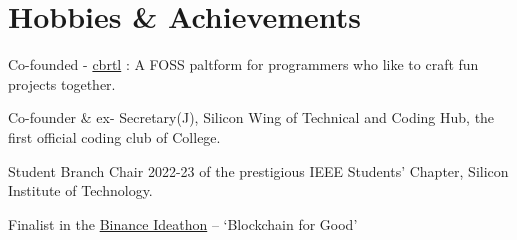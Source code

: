 \documentclass[]{assets/deedy-resume-openfont}
\begin{document}
\section{Hobbies \& Achievements}
\begin{tightemize}  
    \item Co-founded - \href{https://cbrtl.github.io}{cbrtl} : A FOSS paltform for programmers who like to craft fun projects together.\\
    \item Co-founder \& ex- Secretary(J), Silicon Wing of Technical and Coding Hub, the first official coding club of College.\\
    \item Student Branch Chair 2022-23 of the prestigious IEEE Students’ Chapter, Silicon Institute of Technology.\\
    \item Finalist in the \href{https://www.binance.com/en-IN/support/announcement/7ccec2ff0fd0429b8efdddcff962ff64}{Binance Ideathon} – ‘Blockchain for Good’\\
\end{tightemize}
     \ 
     
\end{document}
